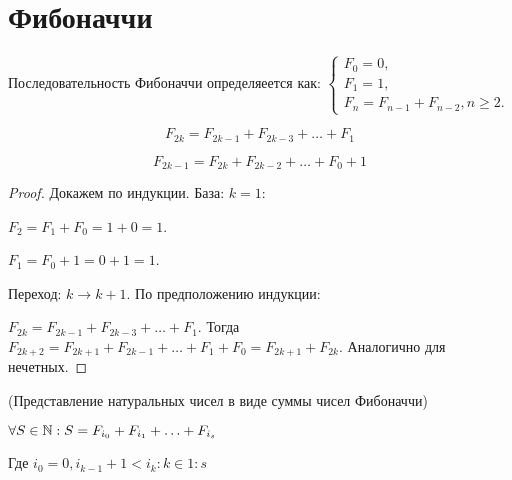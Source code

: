 




\section{Фибоначчи}

\begin{definition}
    Последовательность Фибоначчи определяеется как: $\begin{cases}
        F_0 = 0,\\
        F_1 = 1,\\
        F_n = F_{n-1} + F_{n-2}, n \geq 2.
    \end{cases}$
\end{definition}


\begin{lemma}
    $$F_{2k} = F_{2k-1} + F_{2k-3} + \ldots + F_1$$

    $$F_{2k - 1} = F_{2k} + F_{2k-2} + \ldots + F_0 + 1$$ 

\end{lemma}

\begin{proof}
    Докажем по индукции. База: $k = 1$: 
    
    $F_2 = F_1 + F_0 = 1 + 0 = 1$. 
    
    $F_1 = F_0 + 1 = 0 + 1 = 1$. 
    
    Переход: $k \to k + 1$. По предположению индукции: 
    
    $F_{2k} = F_{2k-1} + F_{2k-3} + \ldots + F_1$. Тогда $F_{2k+2} = F_{2k+1} + F_{2k-1} + \ldots + F_1 + F_0 = F_{2k+1} + F_{2k}$. Аналогично для нечетных.
\end{proof}

\begin{theorem} (Представление натуральных чисел в виде суммы чисел Фибоначчи)

    $\forall S \in \mathbb{N}: S = F_{i_0} + F_{i_1} + \ldots + F_{i_s}$

    Где $i_0 = 0, i_{k-1} + 1 < i_k: k \in 1 : s$
\end{theorem}



